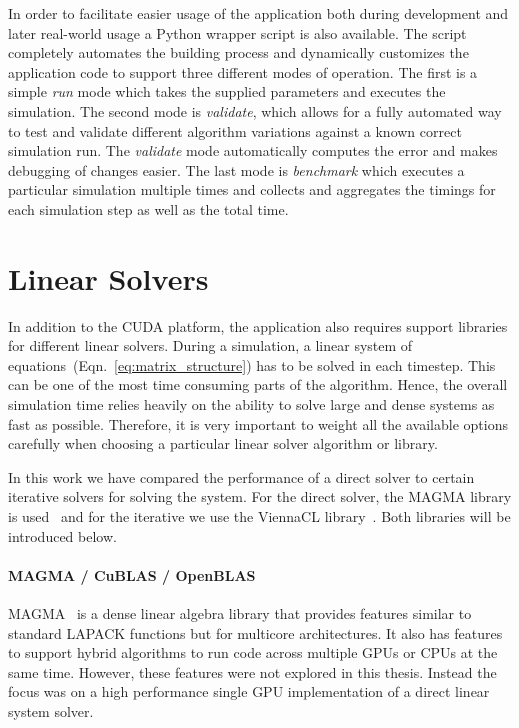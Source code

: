 In order to facilitate easier usage of the application both during development and later real-world usage a Python wrapper script is also available. The script completely automates the building process and dynamically customizes the application code to support three different modes of operation. The first is a simple \emph{run} mode which takes the supplied parameters and executes the simulation. The second mode is \emph{validate}, which allows for a fully automated way to test and validate different algorithm variations against a known correct simulation run. The \emph{validate} mode automatically computes the error and makes debugging of changes easier. The last mode is \emph{benchmark} which executes a particular simulation multiple times and collects and aggregates the timings for each simulation step as well as the total time.

\section{Linear Solvers}
In addition to the CUDA platform, the application also requires support libraries for different linear solvers. During a simulation, a linear system of equations~(Eqn.~\eqref{eq:matrix_structure}) has to be solved in each timestep. This can be one of the most time consuming parts of the algorithm. Hence, the overall simulation time relies heavily on the ability to solve large and dense systems as fast as possible. Therefore, it is very important to weight all the available options carefully when choosing a particular linear solver algorithm or library.

In this work we have compared the performance of a direct solver to certain iterative solvers for solving the system. For the direct solver, the MAGMA library is used~\cite{MagmaDocumentation} and for the iterative we use the ViennaCL library~\cite{ViennaCLDocumentation}. Both libraries will be introduced below.

\paragraph{MAGMA / CuBLAS / OpenBLAS}
MAGMA~\cite{MagmaDocumentation} is a dense linear algebra library that provides features similar to standard LAPACK functions but for multicore architectures. It also has features to support hybrid algorithms to run code across multiple GPUs or CPUs at the same time. However, these features were not explored in this thesis. Instead the focus was on a high performance single GPU implementation of a direct linear system solver.

